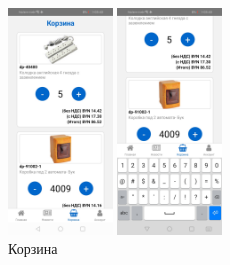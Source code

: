 \begin{figure}[!p]\centering
    \begin{minipage}{0.49\textwidth}
        \centering

        \includegraphics[height=6cm]
        {images/android/basket.jpg}
    \end{minipage}
    \begin{minipage}{0.49\textwidth}
        \centering

        \includegraphics[height=6cm]
        {images/android/basket-change.jpg}
    \end{minipage}

    \caption{Корзина}
    \label{fig:android_basket}
\end{figure}

